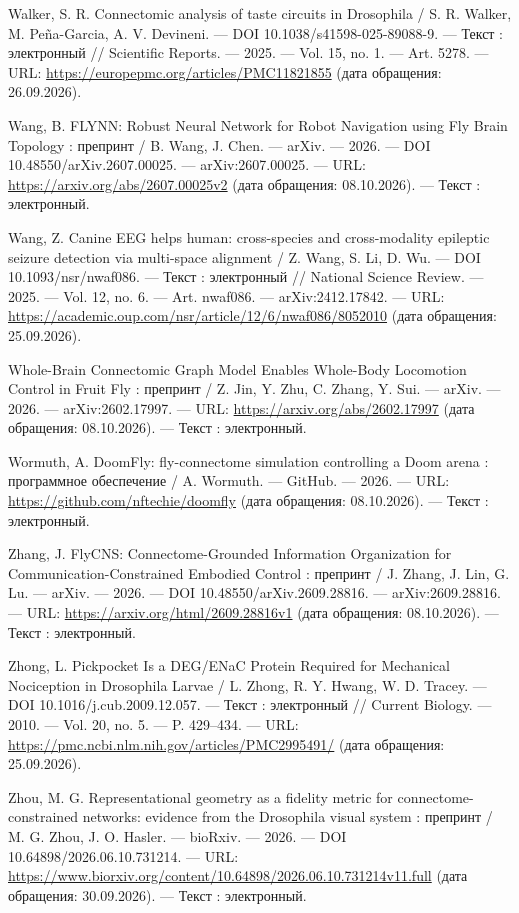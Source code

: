 \begin{list}{}{\setlength{\leftmargin}{10mm}\setlength{\labelwidth}{8mm}\setlength{\labelsep}{2mm}\setlength{\itemsep}{0pt}\setlength{\parsep}{0pt}\setlength{\topsep}{0pt}}
\item[293.] Walker, S. R. Connectomic analysis of taste circuits in Drosophila / S. R. Walker, M. Peña-Garcia, A. V. Devineni. — DOI 10.1038/s41598-025-89088-9. — Текст : электронный // Scientific Reports. — 2025. — Vol. 15, no. 1. — Art. 5278. — URL: \url{https://europepmc.org/articles/PMC11821855} (дата обращения: 26.09.2026).
\item[294.] Wang, B. FLYNN: Robust Neural Network for Robot Navigation using Fly Brain Topology : препринт / B. Wang, J. Chen. — arXiv. — 2026. — DOI 10.48550/arXiv.2607.00025. — arXiv:2607.00025. — URL: \url{https://arxiv.org/abs/2607.00025v2} (дата обращения: 08.10.2026). — Текст : электронный.
\item[295.] Wang, Z. Canine EEG helps human: cross-species and cross-modality epileptic seizure detection via multi-space alignment / Z. Wang, S. Li, D. Wu. — DOI 10.1093/nsr/nwaf086. — Текст : электронный // National Science Review. — 2025. — Vol. 12, no. 6. — Art. nwaf086. — arXiv:2412.17842. — URL: \url{https://academic.oup.com/nsr/article/12/6/nwaf086/8052010} (дата обращения: 25.09.2026).
\item[296.] Whole-Brain Connectomic Graph Model Enables Whole-Body Locomotion Control in Fruit Fly : препринт / Z. Jin, Y. Zhu, C. Zhang, Y. Sui. — arXiv. — 2026. — arXiv:2602.17997. — URL: \url{https://arxiv.org/abs/2602.17997} (дата обращения: 08.10.2026). — Текст : электронный.
\item[297.] Wormuth, A. DoomFly: fly-connectome simulation controlling a Doom arena : программное обеспечение / A. Wormuth. — GitHub. — 2026. — URL: \url{https://github.com/nftechie/doomfly} (дата обращения: 08.10.2026). — Текст : электронный.
\item[298.] Zhang, J. FlyCNS: Connectome-Grounded Information Organization for Communication-Constrained Embodied Control : препринт / J. Zhang, J. Lin, G. Lu. — arXiv. — 2026. — DOI 10.48550/arXiv.2609.28816. — arXiv:2609.28816. — URL: \url{https://arxiv.org/html/2609.28816v1} (дата обращения: 08.10.2026). — Текст : электронный.
\item[299.] Zhong, L. Pickpocket Is a DEG/ENaC Protein Required for Mechanical Nociception in Drosophila Larvae / L. Zhong, R. Y. Hwang, W. D. Tracey. — DOI 10.1016/j.cub.2009.12.057. — Текст : электронный // Current Biology. — 2010. — Vol. 20, no. 5. — P. 429–434. — URL: \url{https://pmc.ncbi.nlm.nih.gov/articles/PMC2995491/} (дата обращения: 25.09.2026).
\item[300.] Zhou, M. G. Representational geometry as a fidelity metric for connectome-constrained networks: evidence from the Drosophila visual system : препринт / M. G. Zhou, J. O. Hasler. — bioRxiv. — 2026. — DOI 10.64898/2026.06.10.731214. — URL: \url{https://www.biorxiv.org/content/10.64898/2026.06.10.731214v11.full} (дата обращения: 30.09.2026). — Текст : электронный.
\end{list}
\endgroup

